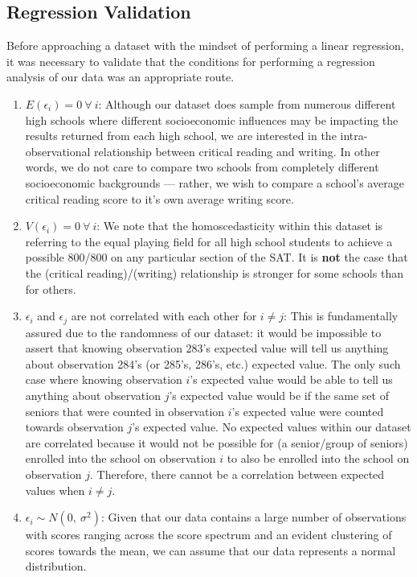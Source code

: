 \documentclass[11pt]{article} %
\begin{document}
\subsection*{Regression Validation}
Before approaching a dataset with the mindset of performing a linear regression, it was necessary to validate that the conditions for performing a regression analysis of our data was an appropriate route.
\begin{enumerate}

	\item \textbf{$E(\epsilon_i) = 0\ \forall\ i$}: Although our dataset does sample from numerous different high schools where different socioeconomic influences may be impacting the results returned from each high school, we are interested in the intra-observational relationship between critical reading and writing. In other words, we do not care to compare two schools from completely different socioeconomic backgrounds --- rather, we wish to compare a school's average critical reading score to it's own average writing score.
	
	\item \textbf{$V(\epsilon_i) = 0\ \forall\ i$}: We note that the homoscedasticity within this dataset is referring to the equal playing field for all high school students to achieve a possible 800/800 on any particular section of the SAT. It is \textbf{not} the case that the (critical reading)/(writing) relationship is stronger for some schools than for others.
	
	\item $\epsilon_i$ and $\epsilon_j$ are not correlated with each other for $i \neq j$: This is fundamentally assured due to the randomness of our dataset: it would be impossible to assert that knowing observation 283's expected value will tell us anything about observation 284's (or 285's, 286's, etc.) expected value. The only such case where knowing observation $i$'s expected value would be able to tell us anything about observation $j$'s expected value would be if the same set of seniors that were counted in observation $i$'s expected value were counted towards observation $j$'s expected value. No expected values within our dataset are correlated because it would not be possible for (a senior/group of seniors) enrolled into the school on observation $i$ to also be enrolled into the school on observation $j$. Therefore, there cannot be a correlation between expected values when $i \neq j$.
	
	\item $\epsilon_i \sim N(0,\ \sigma^2)$: Given that our data contains a large number of observations with scores ranging across the score spectrum and an evident clustering of scores towards the mean, we can assume that our data represents a normal distribution.
\end{enumerate}
\end{document}
